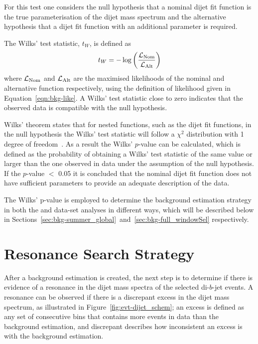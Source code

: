 For this test one considers the null hypothesis that a nominal dijet fit function is the true parameterisation of the dijet mass spectrum
and the alternative hypothesis that a dijet fit function with an additional parameter is required.

\noindent
The Wilks' test statistic, $t_W$, is defined as
\begin{equation}
  t_{W} = -\log{\left(\frac{\ensuremath{\mathcal{L}}_{\text{Nom}}}{\ensuremath{\mathcal{L}}_{\text{Alt}}}\right)}  \label{eqn:bkg-wilks}
\end{equation}
where $\mathcal{L}_{\text{Nom}}$ and $\mathcal{L}_{\text{Alt}}$ are the maximised likelihoods of the nominal and alternative function respectively,
using the definition of likelihood given in Equation~\ref{eqn:bkg-like}.
A Wilks' test statistic close to zero indicates that the observed data is compatible with the null hypothesis.

Wilks' theorem states that for nested functions, such as the dijet fit functions,
in the null hypothesis the Wilks' test statistic will follow a $\chi^2$ distribution with 1 degree of freedom~\cite{dibjet-wilks}.
As a result the Wilks' $p$-value can be calculated, which is defined as the probability of obtaining a
Wilks' test statistic of the same value or larger than the one observed in data under the assumption of the null hypothesis.
If the \mbox{$p$-value} $<$ 0.05 it is concluded that the nominal dijet fit function does not have sufficient
parameters to provide an adequate description of the data.

The Wilks' p-value is employed to determine the background estimation strategy
in both the \summer{} and \lm{} data-set analyses in different ways,
which will be described below in Sections~\ref{sec:bkg-summer_global}~and~\ref{sec:bkg-full_windowSel} respectively.

\vfill
\section{Resonance Search Strategy}
\label{sec:bkg-bh}

After a background estimation is created, the next step is to determine
if there is evidence of a resonance in the dijet mass spectra of the selected di-$b$-jet events.
A resonance can be observed if there is a discrepant excess in the dijet mass spectrum, as illustrated in Figure~\ref{fig:evt-dijet_schem};
an excess is defined as any set of consecutive bins that contains
more events in data than the background estimation,
and discrepant describes how inconsistent an excess is with the background estimation.

